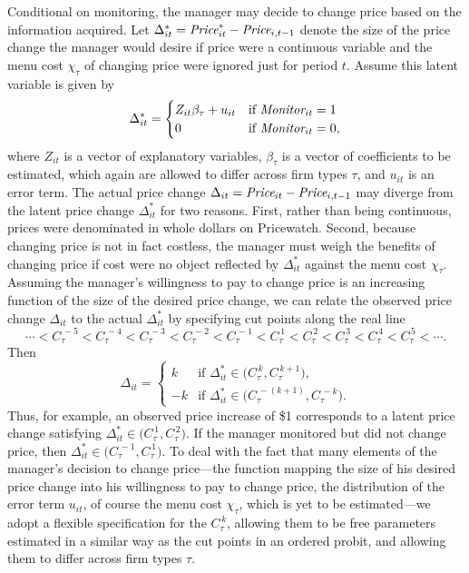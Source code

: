\documentclass[11pt]{article}
\newcommand{\Price}{\mbox{\it Price}}
\newcommand{\Monitor}{\mbox{\it Monitor}}
\newcommand{\cut}[1]{C_{\tau}^{\,#1}}
\begin{document}
\begin{spacing}{1.3}
Conditional on monitoring, the manager may decide to change price
based on the information acquired. Let $\Delta_{it}^* = \Price_{it}^*
- \Price_{i,t-1}$ denote the size of the price change the manager
would desire if price were a continuous variable and the menu cost
$\chi_{\tau}$ of changing price were ignored just for period
$t$. Assume this latent variable is given by
\begin{equation}
\label{latentpricechange}
\Delta_{it}^* = \begin{cases}
 Z_{it} \beta_{\tau} + u_{it} & \text{if $\Monitor_{it} = 1$} \\
 0 & \text{if $\Monitor_{it} = 0$,}
\end{cases}
\end{equation}
where $Z_{it}$ is a vector of explanatory variables, $\beta_{\tau}$ is
a vector of coefficients to be estimated, which again are allowed to
differ across firm types $\tau$, and $u_{it}$ is an error term. The
actual price change $\Delta_{it} = \Price_{it} - \Price_{i,t-1}$ may
diverge from the latent price change $\Delta_{it}^*$ for two
reasons. First, rather than being continuous, prices were denominated
in whole dollars on Pricewatch. Second, because changing price is not
in fact costless, the manager must weigh the benefits of changing
price if cost were no object reflected by $\Delta_{it}^*$ against the
menu cost $\chi_{\tau}$. Assuming the manager's willingness to pay to
change price is an increasing function of the size of the desired
price change, we can relate the observed price change $\Delta_{it}$ to
the actual $\Delta_{it}^*$ by specifying cut points along the real
line
\begin{equation}
\label{C}
\cdots < \cut{-5} < \cut{-4} < \cut{-3} < \cut{-2} < \cut{-1} < \cut{1} 
< \cut{2} < \cut{3} < \cut{4} < \cut{5} < \cdots .
\end{equation}
Then
\begin{equation}
\label{pricechange}
\Delta_{it} = \begin{cases}
k & \text{if $\Delta_{it}^* \in \bigl( \cut{k}, \cut{k+1} \bigr)$,} \\[1ex]
-k & \text{if $\Delta_{it}^* \in \bigl( \cut{-(k+1)}, \cut{-k} \bigr)$.}
\end{cases}
\end{equation}
Thus, for example, an observed price increase of \$1 corresponds to a
latent price change satisfying $\Delta_{it}^* \in \bigl( \cut{1},
\cut{2} \bigr)$. If the manager monitored but did not change price,
then $\Delta_{it}^* \in \bigl( \cut{-1}, \cut{1} \bigr)$. To deal with
the fact that many elements of the manager's decision to change
price---the function mapping the size of his desired price change into
his willingness to pay to change price, the distribution of the error
term $u_{it}$, of course the menu cost $\chi_{\tau}$, which is yet to
be estimated---we adopt a flexible specification for the $\cut{k}$,
allowing them to be free parameters estimated in a similar way as the
cut points in an ordered probit, and allowing them to differ across
firm types $\tau$.


\end{spacing}
\end{document}
